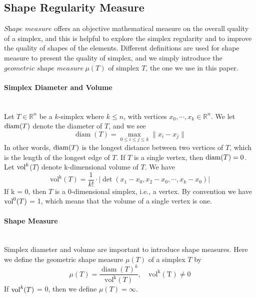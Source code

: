 \subsection{Shape Regularity Measure}%
    $\textit{Shape measure}$ offers an objective mathematical measure on the overall quality of a simplex, and this is helpful to explore the simplex regularity and to improve the quality of shapes of the elements. Different definitions are used for shape measure to present the quality of simplex, and we simply introduce the $\textit{geometric shape measure} ~\mu({T})$ of simplex ${T}$,  the one we use in this paper.

    \paragraph{Simplex Diameter and Volume}\mbox{}\\
    Let $T \in\mathbb{R}^n$ be a $k$-simplex where $k \leqslant n$, with vertices ${x}_0, \cdots, {x}_k \in\mathbb{R}^n$. We let $\operatorname{diam}(T)$ denote the diameter of $T$, and we see
    \begin{equation*}
    \operatorname{diam}(T) = \max_{0\leqslant i\leqslant j\leqslant k} \| x_i - x_j \|
    \end{equation*}
    In other words, $\operatorname{diam}(T)$ is the longest distance between two vertices of $T$, which is the length of the longest edge of $T$. If $T$ is a single vertex, then $\operatorname{diam}(T) = 0$.\\

    \noindent
    Let $\operatorname{vol}^k$(${T}$) denote k-dimensional volume of ${T}$. We have
    \begin{equation*}
    \operatorname{vol^k} (T) = \frac{1}{k!}\cdot|\det(x_1-x_0, x_2-x_0,\cdots, x_k-x_0)|
    \end{equation*}
    \noindent
    If k = 0, then $T$ is a 0-dimensional simplex, i.e., a vertex. By convention we have $\operatorname{vol}^0 ({T})$ = 1, which means that the volume of a single vertex is one.

    
    \paragraph{Shape Measure}\mbox{}\\
    Simplex diameter and volume are important to introduce shape measures. Here we define the {geometric shape measure} $\mu(T)$ of a simplex $T$ by
    \begin{equation*}
    \mu(T) = \frac{\operatorname{diam}(T)^k}{\operatorname{vol^k}(T)}, \quad\operatorname{vol^k(T) \neq 0}
    \end{equation*}
    If $\operatorname{vol}^k(T)$ = 0, then we define $\mu(T) = \infty$.\\
    
